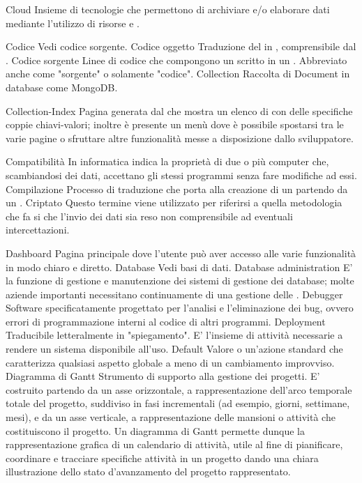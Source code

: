 \elemento
{Cloud} 
{Insieme di tecnologie che permettono di archiviare e/o elaborare dati mediante l'utilizzo di risorse  e .}

\elemento
{Codice} 
{Vedi codice sorgente.}
\elemento
{Codice oggetto}
{Traduzione del  in , comprensibile dal .}
\elemento
{Codice sorgente}
{Linee di codice che compongono un  scritto in un . Abbreviato anche come "sorgente" o solamente "codice".}
\elemento
{Collection} 
{Raccolta di Document in database come MongoDB.}


\elemento
{Collection-Index} 
{Pagina generata dal   che mostra un elenco di  con delle specifiche coppie chiavi-valori; inoltre è presente un menù dove è possibile spostarsi tra le varie pagine  o sfruttare altre funzionalità messe a disposizione dallo sviluppatore.}


\elemento
{Compatibilità}
{In informatica indica la proprietà di due o più computer che, scambiandosi dei dati, accettano gli stessi programmi senza fare modifiche ad essi.}
\elemento
{Compilazione} 
{Processo di traduzione che porta alla creazione di un  partendo da un .}
\elemento
{Criptato} 
{Questo termine viene utilizzato per riferirsi a quella metodologia che fa si che l'invio dei dati sia reso non comprensibile ad eventuali intercettazioni.}

\elemento
{Dashboard}
{Pagina principale dove l'utente può aver accesso alle varie funzionalità in modo chiaro e diretto.}
\elemento
{Database} 
{Vedi basi di dati.}
\elemento
{Database administration} 
{E' la funzione di gestione e manutenzione dei sistemi di gestione dei database; molte aziende importanti necessitano continuamente di una gestione delle .}
\elemento
{Debugger} 
{Software specificatamente progettato per l'analisi e l'eliminazione dei bug, ovvero errori di programmazione interni al codice di altri programmi.}
\elemento
{Deployment} 
{Traducibile letteralmente in "spiegamento". E' l'insieme di attività necessarie a rendere un sistema  disponibile all'uso.}
\elemento
{Default} 
{Valore o un'azione standard che caratterizza qualsiasi aspetto globale a meno di un cambiamento improvviso.}
\elemento
{Diagramma di Gantt}
{Strumento di supporto alla gestione dei progetti. E' costruito partendo da un asse orizzontale, a rappresentazione dell'arco temporale totale del progetto, suddiviso in fasi incrementali (ad esempio, giorni, settimane, mesi), e da un asse verticale, a rappresentazione delle mansioni o attività che costituiscono il progetto. Un diagramma di Gantt permette dunque la rappresentazione grafica di un calendario di attività, utile al fine di pianificare, coordinare e tracciare specifiche attività in un progetto dando una chiara illustrazione dello stato d'avanzamento del progetto rappresentato.} 

